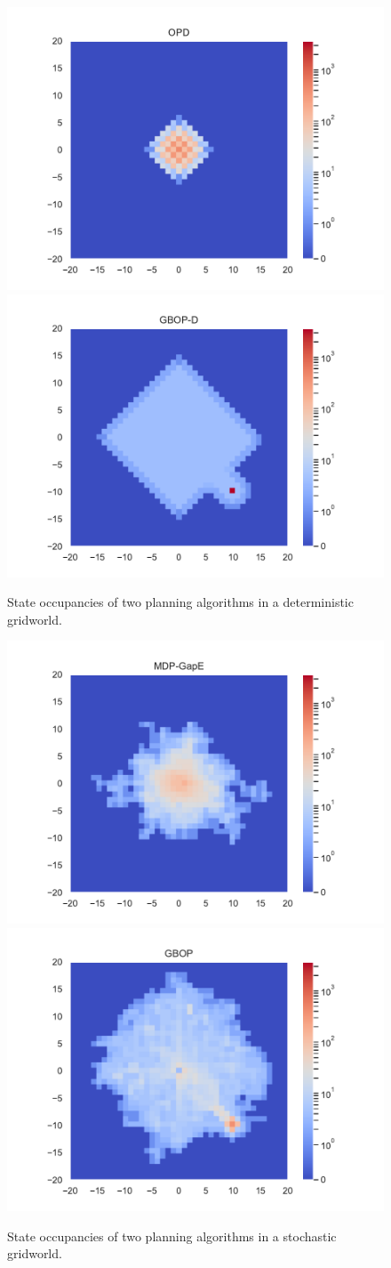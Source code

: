 \documentclass[runningheads]{llncs}
\begin{document}
\begin{figure}[ht]
	\centering
	\includegraphics[trim={1.8cm 0.7cm 1.8cm 0.7cm}, clip, width=0.4\linewidth]{img/occupations_OPD.pdf}
	\includegraphics[trim={1.8cm 0.7cm 1.8cm 0.7cm}, clip, width=0.4\linewidth]{img/occupations_GBOP-D.pdf}
	\caption{State occupancies of two planning algorithms in a deterministic gridworld.}
	\label{fig:deterministic-gridworld}
\end{figure}
\begin{figure}[ht]
	\centering
	\includegraphics[trim={1.8cm 0.7cm 1.8cm 0.7cm}, clip, width=0.4\linewidth]{img/occupations_MDP-GapE.pdf}
	\includegraphics[trim={1.8cm 0.7cm 1.8cm 0.7cm}, clip, width=0.4\linewidth]{img/occupations_GBOP.pdf}
	\caption{State occupancies of two planning algorithms in a stochastic gridworld.}
	\label{fig:stochastic-gridworld}
\end{figure}
\end{document}
